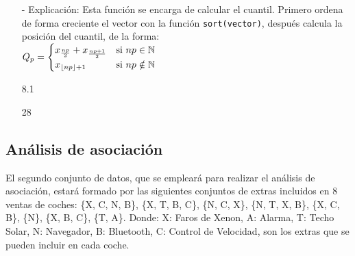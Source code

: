\documentclass[a4paper, 12pt]{article}
\begin{document}
\begin{itemize}
\begin{itemize}
			\item[-] Explicación: Esta función se encarga de calcular el cuantil. Primero ordena de forma creciente el vector con la función \texttt{sort(vector)}, después calcula la posición del cuantil, de la forma: \\
			$\text{\texttt{{$Q_{p}$}}} = \begin{cases} 
				x_{\frac{np}{2}}+x_{\frac{np+1}{2}} & \text{si } np \in \mathbb{N} \\
				x_{\lfloor{np}\rfloor +1} & \text{si } np \notin \mathbb{N}
			\end{cases}$
\begin{Schunk}
\begin{Soutput}
[1] 8.1
\end{Soutput}
\begin{Soutput}
[1] 28
\end{Soutput}
\end{Schunk}
		\end{itemize}
	\end{itemize}
	
	\subsection{Análisis de asociación}
	El segundo conjunto de datos, que se empleará para realizar el análisis de asociación, estará formado por las siguientes conjuntos de extras incluidos en 8 ventas de coches: \{X, C, N, B\}, \{X, T, B, C\}, \{N, C, X\}, \{N, T, X, B\}, \{X, C, B\}, \{N\}, \{X, B, C\}, \{T, A\}. Donde: {X: Faros de Xenon, A: Alarma, T: Techo Solar, N: Navegador, B: Bluetooth, C: Control de Velocidad}, son los extras que se pueden incluir en cada coche.
		
\end{document}
